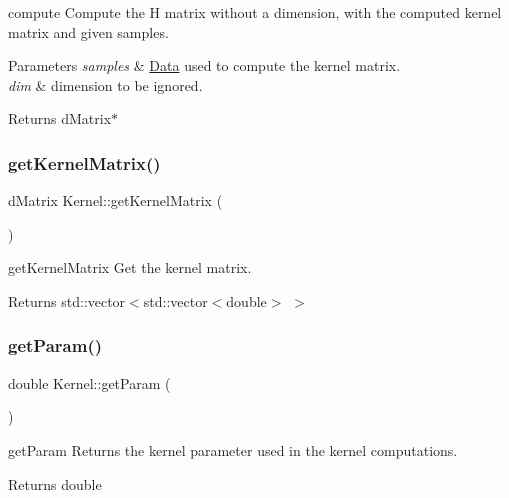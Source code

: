 compute Compute the H matrix without a dimension, with the computed kernel matrix and given samples. 


\begin{DoxyParams}{Parameters}
{\em samples} & \mbox{\hyperlink{class_data}{Data}} used to compute the kernel matrix. \\
\hline
{\em dim} & dimension to be ignored. \\
\hline
\end{DoxyParams}
\begin{DoxyReturn}{Returns}
d\+Matrix$\ast$ 
\end{DoxyReturn}
\mbox{\label{class_kernel_a5e398c63fee5f0e30b6dfb735c75e41a}} 
\subsubsection{\texorpdfstring{get\+Kernel\+Matrix()}{getKernelMatrix()}}
{\footnotesize\ttfamily d\+Matrix Kernel\+::get\+Kernel\+Matrix (\begin{DoxyParamCaption}{ }\end{DoxyParamCaption})}



get\+Kernel\+Matrix Get the kernel matrix. 

\begin{DoxyReturn}{Returns}
std\+::vector$<$std\+::vector$<$double$>$ $>$ 
\end{DoxyReturn}
\mbox{\label{class_kernel_a838e2cc5018fa702e59c52a3bf8ef813}} 
\subsubsection{\texorpdfstring{get\+Param()}{getParam()}}
{\footnotesize\ttfamily double Kernel\+::get\+Param (\begin{DoxyParamCaption}{ }\end{DoxyParamCaption})}



get\+Param Returns the kernel parameter used in the kernel computations. 

\begin{DoxyReturn}{Returns}
double 
\end{DoxyReturn}
\mbox{\label{class_kernel_a5a2cb0fce0eda6c67a2325f6c8958da8}} 
